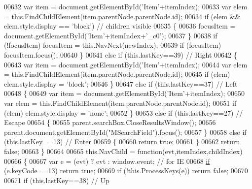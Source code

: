 \begin{DoxyCode}
00632         var item = document.getElementById(\textcolor{stringliteral}{'Item'}+itemIndex);
00633         var elem = this.FindChildElement(item.parentNode.parentNode.id);
00634         \textcolor{keywordflow}{if} (elem && elem.style.display == \textcolor{stringliteral}{'block'}) \textcolor{comment}{// children visible}
00635         \{
00636           focusItem = document.getElementById(\textcolor{stringliteral}{'Item'}+itemIndex+\textcolor{stringliteral}{'\_c0'});
00637         \}
00638         \textcolor{keywordflow}{if} (!focusItem) focusItem = this.NavNext(newIndex);
00639         \textcolor{keywordflow}{if} (focusItem)  focusItem.focus();
00640       \}
00641       \textcolor{keywordflow}{else} \textcolor{keywordflow}{if} (this.lastKey==39) \textcolor{comment}{// Right}
00642       \{
00643         var item = document.getElementById(\textcolor{stringliteral}{'Item'}+itemIndex);
00644         var elem = this.FindChildElement(item.parentNode.parentNode.id);
00645         \textcolor{keywordflow}{if} (elem) elem.style.display = \textcolor{stringliteral}{'block'};
00646       \}
00647       \textcolor{keywordflow}{else} \textcolor{keywordflow}{if} (this.lastKey==37) \textcolor{comment}{// Left}
00648       \{
00649         var item = document.getElementById(\textcolor{stringliteral}{'Item'}+itemIndex);
00650         var elem = this.FindChildElement(item.parentNode.parentNode.id);
00651         \textcolor{keywordflow}{if} (elem) elem.style.display = \textcolor{stringliteral}{'none'};
00652       \}
00653       \textcolor{keywordflow}{else} \textcolor{keywordflow}{if} (this.lastKey==27) \textcolor{comment}{// Escape}
00654       \{
00655         parent.searchBox.CloseResultsWindow();
00656         parent.document.getElementById(\textcolor{stringliteral}{"MSearchField"}).focus();
00657       \}
00658       \textcolor{keywordflow}{else} \textcolor{keywordflow}{if} (this.lastKey==13) \textcolor{comment}{// Enter}
00659       \{
00660         \textcolor{keywordflow}{return} \textcolor{keyword}{true};
00661       \}
00662       \textcolor{keywordflow}{return} \textcolor{keyword}{false};
00663     \}
00664 
00665     this.NavChild = \textcolor{keyword}{function}(evt,itemIndex,childIndex)
00666     \{
00667       var e  = (evt) ? evt : window.event; \textcolor{comment}{// for IE}
00668       \hyperlink{jquery_8js_a9db6d45a025ad692282fe23e69eeba43}{if} (e.keyCode==13) \textcolor{keywordflow}{return} \textcolor{keyword}{true};
00669       \textcolor{keywordflow}{if} (!this.ProcessKeys(e)) \textcolor{keywordflow}{return} \textcolor{keyword}{false};
00670 
00671       \textcolor{keywordflow}{if} (this.lastKey==38) \textcolor{comment}{// Up}

\end{DoxyCode}
